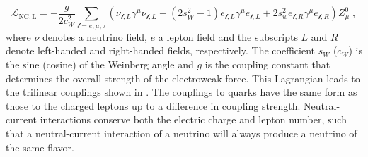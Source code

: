 \begin{equation}
  \mathcal{L}_\mathrm{NC,L} = -\frac{g}{2 c_W^2} \sum_{\mathcal{l}=e,\mu,\tau} (\bar{\nu}_{\mathcal{l}, L} \gamma^\mu \nu_{\mathcal{l}, L} + (2 s_W^2 - 1) \bar{e}_{\mathcal{l}, L} \gamma^\mu e_{\mathcal{l}, L} + 2s_w^2 \bar{e}_{\mathcal{l}, R} \gamma^\mu e_{\mathcal{l}, R}) Z^0_\mu\;, \label{eq:ew-nc-lagrangian}
\end{equation}
where $\nu$ denotes a neutrino field, $e$ a lepton field and the subscripts $L$ and $R$ denote left-handed and right-handed fields, respectively.
The coefficient $s_W$ ($c_W$) is the sine (cosine) of the Weinberg angle and $g$ is the coupling constant that determines the overall strength of the electroweak force.
This Lagrangian leads to the trilinear couplings shown in .
The couplings to quarks have the same form as those to the charged leptons up to a difference in coupling strength.
Neutral-current interactions conserve both the electric charge and lepton number, such that a neutral-current interaction of a neutrino will always produce a neutrino of the same flavor.

